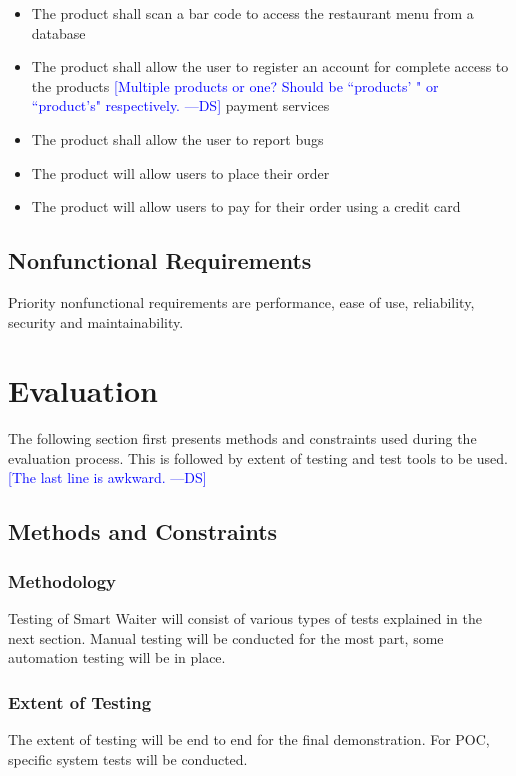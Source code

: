 \documentclass[12pt]{article}
\newcommand{\authornote}[3]{\textcolor{#1}{[#3 ---#2]}}
\newcommand{\authornote}[3]{}
\newcommand{\ds}[1]{\authornote{blue}{DS}{#1}}
\begin{document}
\noindent
\begin{itemize}
\item The product shall scan a bar code to access the restaurant menu from a database
\item The product shall allow the user to register an account for complete access to the products 
\ds{Multiple products or one? Should be ``products' " or ``product's" respectively.}
payment services
\item The product shall allow the user to report bugs
\item The product will allow users to place their order
\item The product will allow users to pay for their order using a credit card
\end{itemize}  

\subsection{Nonfunctional Requirements}
Priority nonfunctional requirements are performance, ease of use, reliability, security and maintainability.


%
%

\section{Evaluation}

The following section first presents methods and constraints used during the evaluation process. This is followed by extent of testing and test tools to be used.
\ds{The last line is awkward.}

\subsection{ Methods and Constraints} 

\subsubsection{Methodology} 
Testing of Smart Waiter will consist of various types of tests explained in the next section. Manual testing will be conducted for the most part, some automation testing will be in place.

\subsubsection{Extent of Testing}
The extent of testing will be end to end for the final demonstration. For POC, specific system tests will be conducted.
\end{document}
